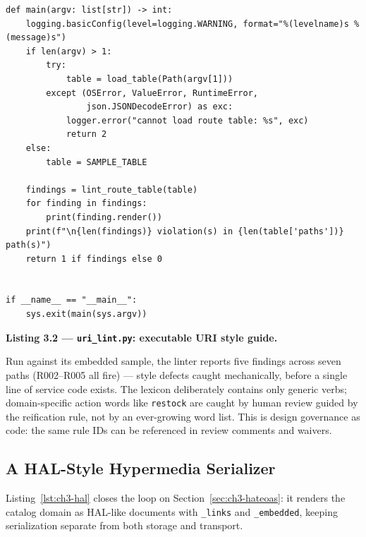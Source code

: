 \begin{verbatim}
def main(argv: list[str]) -> int:
    logging.basicConfig(level=logging.WARNING, format="%(levelname)s %(message)s")
    if len(argv) > 1:
        try:
            table = load_table(Path(argv[1]))
        except (OSError, ValueError, RuntimeError,
                json.JSONDecodeError) as exc:
            logger.error("cannot load route table: %s", exc)
            return 2
    else:
        table = SAMPLE_TABLE

    findings = lint_route_table(table)
    for finding in findings:
        print(finding.render())
    print(f"\n{len(findings)} violation(s) in {len(table['paths'])} path(s)")
    return 1 if findings else 0


if __name__ == "__main__":
    sys.exit(main(sys.argv))
\end{verbatim}

\noindent\textbf{Listing 3.2 --- \texttt{uri\_lint.py}: executable URI style
guide.}\label{lst:ch3-urilint}

Run against its embedded sample, the linter reports five findings across seven
paths (R002--R005 all fire) --- style defects caught mechanically, before a
single line of service code exists. The lexicon deliberately contains only
generic verbs; domain-specific action words like \texttt{restock} are caught by
human review guided by the reification rule, not by an ever-growing word list. This is design governance as code: the same
rule IDs can be referenced in review comments and waivers.

\subsection{A HAL-Style Hypermedia Serializer}

Listing~\ref{lst:ch3-hal} closes the loop on Section~\ref{sec:ch3-hateoas}: it
renders the catalog domain as HAL-like documents with \texttt{\_links} and
\texttt{\_embedded}, keeping serialization separate from both storage and
transport.

